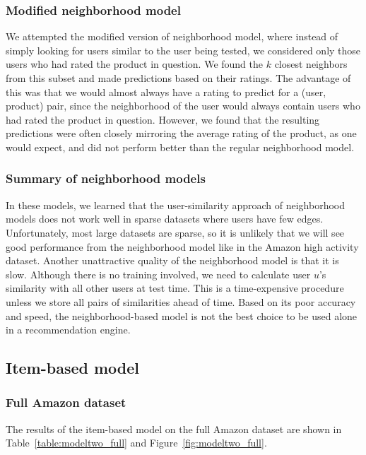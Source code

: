 \documentclass[letterpaper, 11 pt, conference]{ieeeconf}
\begin{document}
\subsubsection{Modified neighborhood model}

We attempted the modified version of neighborhood model, where instead of
simply looking for users similar to the user being tested, we considered
only those users who had rated the product in question. We found the $k$
closest neighbors from this subset and made predictions based on their
ratings. The advantage of this was that we would almost always have a
rating to predict for a (user, product) pair, since the neighborhood of
the user would always contain users who had rated the product in
question. However, we found that the resulting predictions were often closely
mirroring the average rating of the product, as one would expect, and did
not perform better than the regular neighborhood model.


\subsubsection{Summary of neighborhood models}
In these models, we learned that the user-similarity approach of neighborhood 
models does not work well in sparse datasets where users have few edges. 
Unfortunately, most large datasets are sparse, so it is unlikely that we will 
see good performance from the neighborhood model like in the Amazon high 
activity dataset. Another unattractive quality of the neighborhood model is 
that it is slow. Although there is no training involved, we need to calculate 
user $u$'s similarity with all other users at test time. This is a 
time-expensive procedure unless we store all pairs of similarities 
ahead of time. Based on its poor accuracy and speed, the neighborhood-based 
model is not the best choice to be used alone in a recommendation engine.


\subsection{Item-based model}

\subsubsection{Full Amazon dataset}
The results of the item-based model on the full Amazon dataset 
are shown in Table~\ref{table:modeltwo_full} and Figure~\ref{fig:modeltwo_full}.
\end{document}
